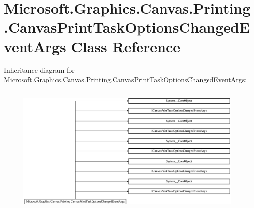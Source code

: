\hypertarget{class_microsoft_1_1_graphics_1_1_canvas_1_1_printing_1_1_canvas_print_task_options_changed_event_args}{}\section{Microsoft.\+Graphics.\+Canvas.\+Printing.\+Canvas\+Print\+Task\+Options\+Changed\+Event\+Args Class Reference}
\label{class_microsoft_1_1_graphics_1_1_canvas_1_1_printing_1_1_canvas_print_task_options_changed_event_args}
Inheritance diagram for Microsoft.\+Graphics.\+Canvas.\+Printing.\+Canvas\+Print\+Task\+Options\+Changed\+Event\+Args\+:\begin{figure}[H]
\begin{center}
\leavevmode
\includegraphics[height=6.497890cm]{class_microsoft_1_1_graphics_1_1_canvas_1_1_printing_1_1_canvas_print_task_options_changed_event_args}
\end{center}
\end{figure}
